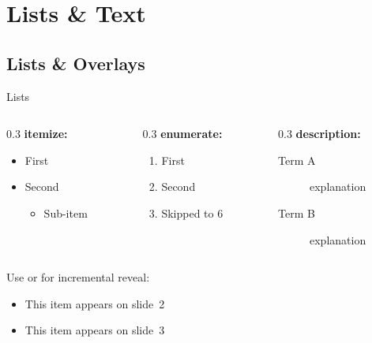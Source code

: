 \documentclass[presentation, aspectratio=169]{beamer}
\begin{document}
\section{Lists \& Text}

\subsection{Lists \& Overlays}

\begin{frame}{Lists}
  \begin{columns}
    \begin{column}{0.3\columnwidth}
      \textbf{itemize:}
      \begin{itemize}
        \item First
        \item Second
          \begin{itemize}
            \item Sub-item
          \end{itemize}
      \end{itemize}
    \end{column}
    \begin{column}{0.3\columnwidth}
      \textbf{enumerate:}
      \begin{enumerate}
        \item First
        \item Second
          \setcounter{enumi}{5}
        \item Skipped to 6
      \end{enumerate}
    \end{column}
    \begin{column}{0.3\columnwidth}
      \textbf{description:}
      \begin{description}
        \item[Term A] explanation
        \item[Term B] explanation
      \end{description}
    \end{column}
  \end{columns}

  \vspace{0.4em}
  Use  or  for incremental reveal:
  \begin{itemize}
    \item<2-> This item appears on slide~2
    \item<3-> This item appears on slide~3
  \end{itemize}
\end{frame}
\end{document}
